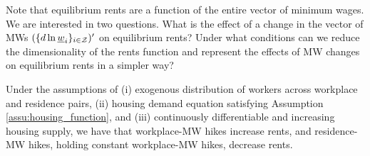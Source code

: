 
Note that equilibrium rents are a function of the entire vector of minimum wages. 
We are interested in two questions.
What is the effect of a change in the vector of MWs $(\{d \ln \underline{w}_i\}_{i\in\mathcal{Z}})'$
on equilibrium rents?
Under what conditions can we reduce the dimensionality of the rents function and 
represent the effects of MW changes on equilibrium rents in a simpler way?

\begin{prop}\label{prop:comparative_statics}
    Under the assumptions of
    (i) exogenous distribution of workers across workplace and residence pairs, 
    (ii) housing demand equation satisfying Assumption \ref{assu:housing_function}, 
    and 
    (iii) continuously differentiable and increasing housing supply, we have that
    workplace-MW hikes increase rents, and residence-MW hikes, holding constant 
    workplace-MW hikes, decrease rents.
\end{prop}

